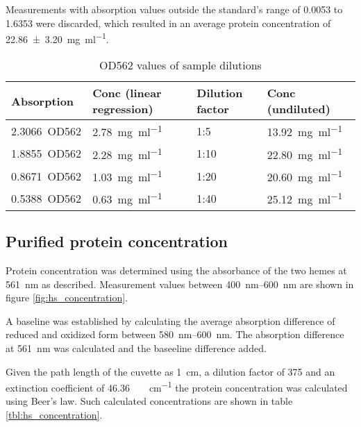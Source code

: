 Measurements with absorption values outside the standard's range of 0.0053 to
1.6353 were discarded, which resulted in an average protein concentration of
\SI{22.86 \pm 3.20}{\mg\per\ml}.

\begin{table}
	\centering
	\begin{tabu}{llll}
		\toprule
		Absorption & Conc (linear regression) & Dilution factor & Conc (undiluted) \\
		\midrule
		\SI{2.3066}{OD562} & \SI{2.78}{\mg\per\ml} & 1:5  & \SI{13.92}{\mg\per\ml} \\
		\SI{1.8855}{OD562} & \SI{2.28}{\mg\per\ml} & 1:10 & \SI{22.80}{\mg\per\ml} \\
		\SI{0.8671}{OD562} & \SI{1.03}{\mg\per\ml} & 1:20 & \SI{20.60}{\mg\per\ml} \\
		\SI{0.5388}{OD562} & \SI{0.63}{\mg\per\ml} & 1:40 & \SI{25.12}{\mg\per\ml} \\
		\bottomrule
	\end{tabu}
	\caption{OD562 values of sample dilutions}
	\label{tbl:bca_absorption_sample}
\end{table}

\subsection{Purified protein concentration}

Protein concentration was determined using the absorbance of the two hemes at
\SI{561}{\nm} as described. Measurement values between \SIrange{400}{600}{\nm}
are shown in figure \ref{fig:hs_concentration}.

A baseline was established by calculating the average absorption difference of
reduced and oxidized form between \SIrange{580}{600}{\nm}. The absorption
difference at \SI{561}{\nm} was calculated and the baseeline difference added.

Given the path length of the cuvette as \SI{1}{\cm}, a dilution factor of 375
and an extinction coefficient of \SI{46.36}{\per\milli\Molar\per\cm} the
protein concentration was calculated using Beer's law. Such calculated
concentrations are shown in table \ref{tbl:hs_concentration}.

